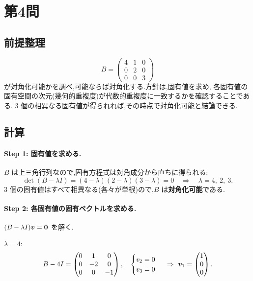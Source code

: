 \documentclass[11pt,a4paper]{article}
\begin{document}
\section*{第4問}

\subsection*{前提整理}

\[
B=\begin{pmatrix}4&1&0\\0&2&0\\0&0&3\end{pmatrix}
\]
が対角化可能かを調べ,可能ならば対角化する.方針は,固有値を求め,
各固有値の固有空間の次元(幾何的重複度)が代数的重複度に一致するかを確認することである.
$3$ 個の相異なる固有値が得られれば,その時点で対角化可能と結論できる.

\subsection*{計算}

\paragraph{Step 1: 固有値を求める.}
$B$ は上三角行列なので,固有方程式は対角成分から直ちに得られる:
\[
\det(B-\lambda I)
=(4-\lambda)(2-\lambda)(3-\lambda)=0
\quad\Longrightarrow\quad
\lambda=4,\ 2,\ 3.
\]
$3$ 個の固有値はすべて相異なる(各々が単根)ので,$B$ は\textbf{対角化可能}である.

\paragraph{Step 2: 各固有値の固有ベクトルを求める.}
$(B-\lambda I)\bm{v}=\bm{0}$ を解く.

\smallskip
\noindent$\lambda=4$:
\[
B-4I=\begin{pmatrix}0&1&0\\0&-2&0\\0&0&-1\end{pmatrix},\quad
\begin{cases}v_2=0\\ v_3=0\end{cases}
\ \Rightarrow\ \bm{v}_1=\begin{pmatrix}1\\0\\0\end{pmatrix}.
\]
\end{document}
